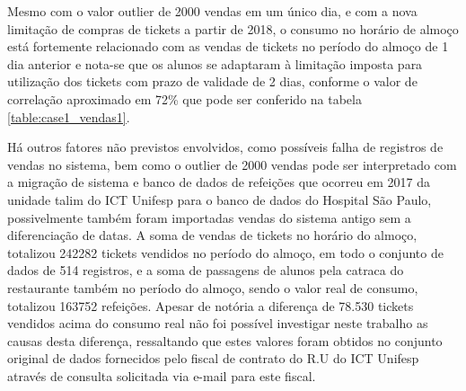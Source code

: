         Mesmo com o valor outlier de 2000 vendas em um único dia, e com a nova limitação de compras de tickets a partir de 2018, o consumo no horário de almoço está fortemente relacionado com as vendas de tickets no período do almoço de 1 dia anterior e nota-se que os alunos se adaptaram à limitação imposta para utilização dos tickets com prazo de validade de 2 dias, conforme o valor de correlação aproximado em 72\% que pode ser conferido na tabela \ref{table:case1_vendas1}.
        
        Há outros fatores não previstos envolvidos, como possíveis falha de registros de vendas no sistema, bem como o outlier de 2000 vendas pode ser interpretado com a migração de sistema e banco de dados de refeições que ocorreu em 2017 da unidade talim do ICT Unifesp para o banco de dados do Hospital São Paulo, possivelmente também foram importadas vendas do sistema antigo sem a diferenciação de datas. A soma de vendas de tickets no horário do almoço, totalizou 242282 tickets vendidos no período do almoço, em todo o conjunto de dados de 514 registros, e a soma de passagens de alunos pela catraca do restaurante também no período do almoço, sendo o valor real de consumo, totalizou 163752 refeições. Apesar de notória a diferença de 78.530 tickets vendidos acima do consumo real não foi possível investigar neste trabalho as causas desta diferença, ressaltando que estes valores foram obtidos no conjunto original de dados fornecidos pelo fiscal de contrato do R.U do ICT Unifesp através de consulta solicitada via e-mail para este fiscal.

